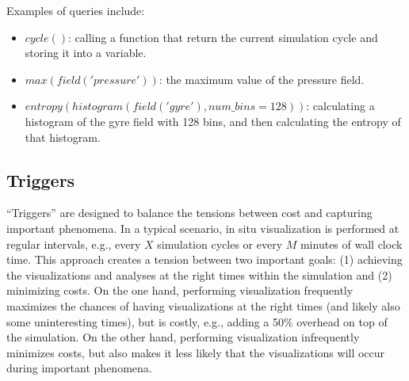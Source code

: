 Examples of queries include:
\begin{itemize}
\item $cycle()$: calling a function that return the current simulation cycle and storing it into a variable.
\item $max(field('pressure'))$: the maximum value of the pressure field.
\item $entropy(histogram(field('gyre'), num\_bins=128))$: calculating a histogram of the gyre field with 128 bins, and then calculating the entropy of that histogram.
\end{itemize}
%

%
%

\subsection{Triggers}
\label{sec:ascent:triggers}

``Triggers'' are designed to balance the tensions between cost and capturing important phenomena.
%
In a typical scenario, in situ visualization is performed at regular intervals, e.g.,
every $X$ simulation cycles or every $M$ minutes of wall clock time.
%
This approach creates a tension between two important goals:
(1) achieving the visualizations and analyses at the right times within the simulation
and (2) minimizing costs.
%
On the one hand, performing visualization frequently maximizes the chances of having
visualizations at the right times (and likely also some uninteresting times), but
is costly,  e.g., adding a 50\% overhead on top of the simulation.
%
On the other hand, performing visualization infrequently minimizes costs, but also makes it
less likely that the visualizations will occur during important phenomena.
%

